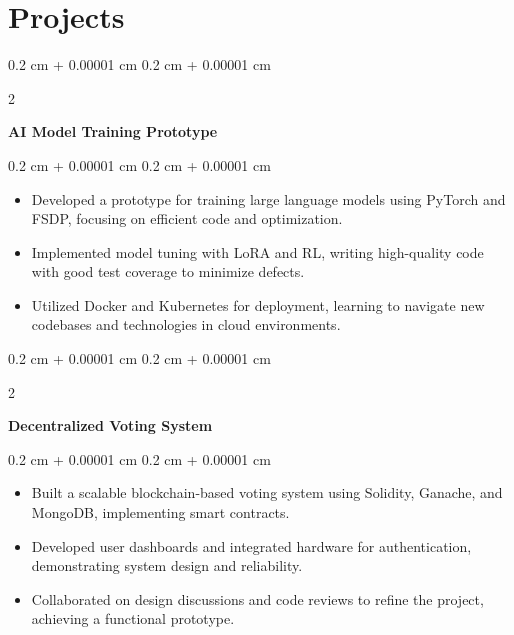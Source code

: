 \documentclass[10pt, letterpaper]{article}
\newenvironment{highlights}{
    \begin{itemize}[
        topsep=0.10 cm,
        parsep=0.10 cm,
        partopsep=0pt,
        itemsep=0pt,
        leftmargin=0.4 cm + 10pt
    ]
}{
    \end{itemize}
} %
\newenvironment{onecolentry}{
    \begin{adjustwidth}{
        0.2 cm + 0.00001 cm
    }{
        0.2 cm + 0.00001 cm
    }
}{
    \end{adjustwidth}
} %
\newenvironment{twocolentry}[2][]{
    \onecolentry
    \def\secondColumn{#2}
    \setcolumnwidth{\fill, 4.5 cm}
    \begin{paracol}{2}
}{
    \switchcolumn \raggedleft \secondColumn
    \end{paracol}
    \endonecolentry
} %
\let\hrefWithoutArrow\href
\renewcommand{\href}[2]{\hrefWithoutArrow{#1}{\ifthenelse{\equal{#2}{}}{ }{#2 }\raisebox{.15ex}{\footnotesize \faExternalLink*}}}
\begin{document}
    \section{Projects}
    \begin{twocolentry}{}
        \textbf{AI Model Training Prototype} \href{https://github.com/deadhearth01/ai-model-prototype}{\faGithub}
    \end{twocolentry}
    \vspace{0.10 cm}
    \begin{onecolentry}
        \begin{highlights}
            \item Developed a prototype for training large language models using PyTorch and FSDP, focusing on efficient code and optimization.
            \item Implemented model tuning with LoRA and RL, writing high-quality code with good test coverage to minimize defects.
            \item Utilized Docker and Kubernetes for deployment, learning to navigate new codebases and technologies in cloud environments.
        \end{highlights}
    \end{onecolentry}
    \vspace{0.10 cm}
    \begin{twocolentry}{}
        \textbf{Decentralized Voting System} \href{https://github.com/deadhearth01/decentralized-voting-system-R307S}{\faGithub}
    \end{twocolentry}
    \vspace{0.10 cm}
    \begin{onecolentry}
        \begin{highlights}
            \item Built a scalable blockchain-based voting system using Solidity, Ganache, and MongoDB, implementing smart contracts.
            \item Developed user dashboards and integrated hardware for authentication, demonstrating system design and reliability.
            \item Collaborated on design discussions and code reviews to refine the project, achieving a functional prototype.
        \end{highlights}
    \end{onecolentry}
\end{document}
